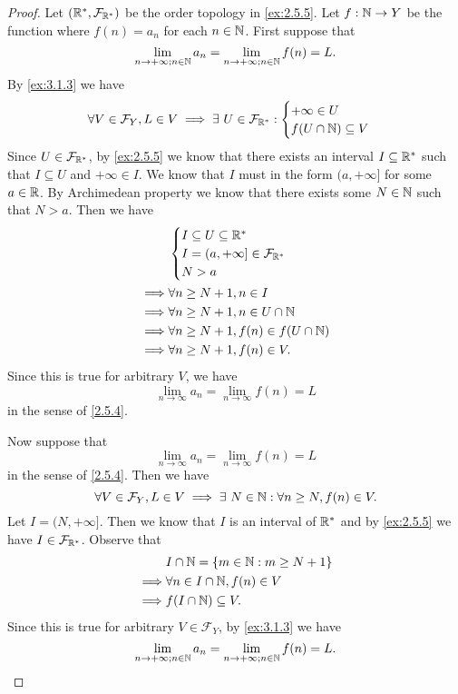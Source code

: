 \begin{proof}
  Let \((\mathbb{R}^*, \mathcal{F}_{\mathbb{R}^*})\) be the order topology in \cref{ex:2.5.5}.
  Let \(f : \mathbb{N} \to Y\) be the function where \(f(n) = a_n\) for each \(n \in \mathbb{N}\).
  First suppose that
  \[
    \lim_{n \to +\infty ; n \in \mathbb{N}} a_n = \lim_{n \to +\infty ; n \in \mathbb{N}} f(n) = L.
  \]
  By \cref{ex:3.1.3} we have
  \[
    \forall V \in \mathcal{F}_Y, L \in V \implies \exists\ U \in \mathcal{F}_{\mathbb{R}^*} : \begin{cases}
      +\infty \in U \\
      f(U \cap \mathbb{N}) \subseteq V
    \end{cases}
  \]
  Since \(U \in \mathcal{F}_{\mathbb{R}^*}\), by \cref{ex:2.5.5} we know that there exists an interval \(I \subseteq \mathbb{R}^*\) such that \(I \subseteq U\) and \(+\infty \in I\).
  We know that \(I\) must in the form \((a, +\infty]\) for some \(a \in \mathbb{R}\).
  By Archimedean property we know that there exists some \(N \in \mathbb{N}\) such that \(N > a\).
  Then we have
  \begin{align*}
             & \begin{cases}
                 I \subseteq U \subseteq \mathbb{R}^*            \\
                 I = (a, +\infty] \in \mathcal{F}_{\mathbb{R}^*} \\
                 N > a
               \end{cases}     \\
    \implies & \forall n \geq N + 1, n \in I               \\
    \implies & \forall n \geq N + 1, n \in U \cap \mathbb{N}       \\
    \implies & \forall n \geq N + 1, f(n) \in f(U \cap \mathbb{N}) \\
    \implies & \forall n \geq N + 1, f(n) \in V.
  \end{align*}
  Since this is true for arbitrary \(V\), we have
  \[
    \lim_{n \to \infty} a_n = \lim_{n \to \infty} f(n) = L
  \]
  in the sense of \cref{2.5.4}.

  Now suppose that
  \[
    \lim_{n \to \infty} a_n = \lim_{n \to \infty} f(n) = L
  \]
  in the sense of \cref{2.5.4}.
  Then we have
  \[
    \forall V \in \mathcal{F}_Y, L \in V \implies \exists\ N \in \mathbb{N} : \forall n \geq N, f(n) \in V.
  \]
  Let \(I = (N, +\infty]\).
  Then we know that \(I\) is an interval of \(\mathbb{R}^*\) and by \cref{ex:2.5.5} we have \(I \in \mathcal{F}_{\mathbb{R}^*}\).
  Observe that
  \begin{align*}
             & I \cap \mathbb{N} = \{m \in \mathbb{N} : m \geq N + 1\} \\
    \implies & \forall n \in I \cap \mathbb{N}, f(n) \in V     \\
    \implies & f(I \cap \mathbb{N}) \subseteq V.
  \end{align*}
  Since this is true for arbitrary \(V \in \mathcal{F}_Y\), by \cref{ex:3.1.3} we have
  \[
    \lim_{n \to +\infty ; n \in \mathbb{N}} a_n = \lim_{n \to +\infty ; n \in \mathbb{N}} f(n) = L.
  \]
\end{proof}

